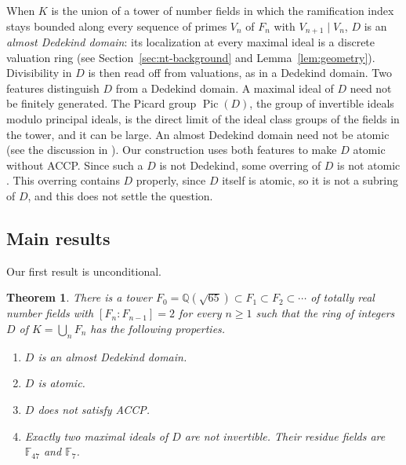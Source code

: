 \documentclass[11pt]{article}
\theoremstyle{plain}
\newtheorem{introtheorem}{Theorem}
\theoremstyle{definition}
\theoremstyle{remark}
\DeclareMathOperator{\Pic}{Pic}
\newcommand{\Q}{\mathbb Q}
\newcommand{\F}{\mathbb F}
\begin{document}
When $K$ is the union of a tower of number fields in which the
ramification index stays bounded along every sequence of primes $V_n$ of
$F_n$ with $V_{n+1}\mid V_n$, $D$ is an
\emph{almost Dedekind domain}: its localization at every maximal ideal is
a discrete valuation ring \cite[\S36]{Gilmer} (see
Section~\ref{sec:nt-background} and Lemma~\ref{lem:geometry}).  Divisibility in $D$ is then
read off from valuations, as in a Dedekind domain.  Two features
distinguish $D$ from a Dedekind domain.  A maximal ideal of $D$ need not be
finitely generated.  The Picard group $\Pic(D)$, the group of invertible
ideals modulo principal ideals, is the direct limit of the ideal class
groups of the fields in the tower, and it can be large.  An almost Dedekind
domain need not be atomic (see the discussion in \cite[Section~2]{CGH}).
Our construction uses both features to make $D$ atomic without ACCP.  Since
such a $D$ is not Dedekind, some overring of $D$ is not atomic
\cite[Theorem~3.6]{CGH}.  This overring contains $D$ properly, since $D$
itself is atomic, so it is not a subring of $D$, and this does not settle
the question.

\subsection{Main results}\label{sec:intro-results}

Our first result is unconditional.

\begin{introtheorem}\label{thm:A}
There is a tower
$F_0=\Q(\sqrt{65})\subset F_1\subset F_2\subset\cdots$ of totally real
number fields with $[F_n:F_{n-1}]=2$ for every $n\ge1$ such that the ring
of integers $D$ of $K=\bigcup_nF_n$ has the following properties.
\begin{enumerate}
\item[\textup{(a)}] $D$ is an almost Dedekind domain.
\item[\textup{(b)}] $D$ is atomic.
\item[\textup{(c)}] $D$ does not satisfy ACCP.
\item[\textup{(d)}] Exactly two maximal ideals of $D$ are not invertible.
Their residue fields are $\F_{47}$ and $\F_7$.
\end{enumerate}
\end{introtheorem}
\end{document}
